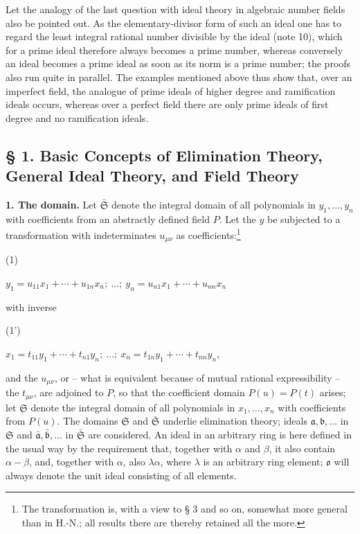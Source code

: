 \documentclass[11pt]{article}
\providecommand{\srcnumdisplay}[3][3.4em]{%
  \par\smallskip\noindent
  \begin{minipage}[t]{#1}\vspace*{0pt}#2\end{minipage}%
  \begin{minipage}[t]{\dimexpr\linewidth-#1\relax}\vspace*{0pt}\centering
  \(\displaystyle #3\)
  \end{minipage}\par\smallskip}
\providecommand{\frakS}{\mathfrak S}
\providecommand{\fraka}{\mathfrak a}
\providecommand{\frakb}{\mathfrak b}
\providecommand{\frako}{\mathfrak o}
\providecommand{\frako}{\mathfrak o}
\providecommand{\fraka}{\mathfrak a}
\providecommand{\frakS}{\mathfrak S}
\begin{document}
Let the analogy of the last question with ideal theory in algebraic number fields also be pointed out. As the elementary-divisor form of such an ideal one has to regard the least integral rational number divisible by the ideal (note 10), which for a prime ideal therefore always becomes a prime number, whereas conversely an ideal becomes a prime ideal as soon as its norm is a prime number; the proofs also run quite in parallel. The examples mentioned above thus show that, over an imperfect field, the analogue of prime ideals of higher degree and ramification ideals occurs, whereas over a perfect field there are only prime ideals of first degree and no ramification ideals.

\subsection*{§ 1. Basic Concepts of Elimination Theory, General Ideal Theory, and Field Theory}

\textbf{1. The domain.} Let $\bar{\frakS}$ denote the integral domain of all polynomials in $y_1,\ldots,y_n$ with coefficients from an abstractly defined field $P$. Let the $y$ be subjected to a transformation with indeterminates $u_{\mu\nu}$ as coefficients:\footnote{The transformation is, with a view to § 3 and so on, somewhat more general than in H.-N.; all results there are thereby retained all the more.}
\srcnumdisplay{(1)}{y_1=u_{11}x_1+\cdots+u_{1n}x_n;\ \ldots;\ y_n=u_{n1}x_1+\cdots+u_{nn}x_n}
with inverse
\srcnumdisplay{(1')}{x_1=t_{11}y_1+\cdots+t_{n1}y_n;\ \ldots;\ x_n=t_{1n}y_1+\cdots+t_{nn}y_n,}
and the $u_{\mu\nu}$, or -- what is equivalent because of mutual rational expressibility -- the $t_{\mu\nu}$, are adjoined to $P$, so that the coefficient domain $P(u)=P(t)$ arises; let $\frakS$ denote the integral domain of all polynomials in $x_1,\ldots,x_n$ with coefficients from $P(u)$. The domains $\frakS$ and $\bar{\frakS}$ underlie elimination theory; ideals $\fraka,\frakb,\ldots$ in $\frakS$ and $\bar{\fraka},\bar{\frakb},\ldots$ in $\bar{\frakS}$ are considered. An ideal in an arbitrary ring is here defined in the usual way by the requirement that, together with $\alpha$ and $\beta$, it also contain $\alpha-\beta$, and, together with $\alpha$, also $\lambda\alpha$, where $\lambda$ is an arbitrary ring element; $\frako$ will always denote the unit ideal consisting of all elements.
\end{document}

